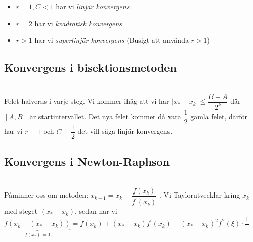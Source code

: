 \begin{itemize}
  \item $r=1, C<1$ har vi \textit{linjär konvergens}
  \item $r=2$ har vi \textit{kvadratisk konvergens}
  \item $r>1$ har vi \textit{superlinjär konvergens} (Busigt att använda $r>1$)
\end{itemize}
\par\bigskip

\subsection{Konvergens i bisektionsmetoden}\hfill\\

\noindent Felet halveras i varje steg. Vi kommer ihåg att vi har $\left|x_*-x_k\right|\leq \dfrac{B-A}{2^k}$ där $[A,B]$ är startintervallet. Det nya felet kommer då vara $\dfrac{1}{2}$ gamla felet, därför har vi $r=1$ och $C=\dfrac{1}{2}$ det vill säga linjär konvergens.
\par\bigskip

\subsection{Konvergens i Newton-Raphson}\hfill\\

\noindent Påminner oss om metoden: $x_{k+1} = x_k -\dfrac{f(x_k)}{f^{\prime}(x_k)}$ . Vi Taylorutvecklar kring $x_k$ med steget $(x_*-x_k)$. sedan har vi $\underbrace{f(x_k+(x_*-x_k))}_{\text{$f(x_*)=0$}} = f(x_k)+(x_*-x_k)f^{\prime}(x_k)+(x_*-x_k)^2f^{\prime\prime}(\xi)\cdot\dfrac{1}{}$ 













